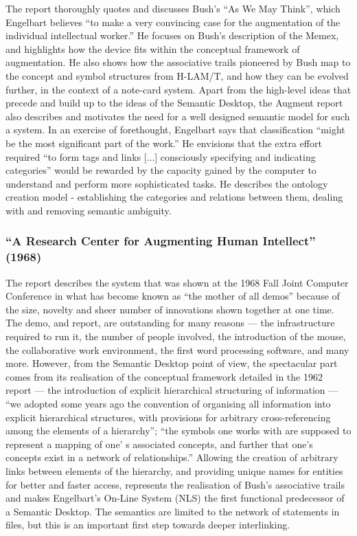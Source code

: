 The report thoroughly quotes and discusses Bush's ``As We May Think'', which Engelbart believes ``to make a very convincing case for the augmentation of the individual intellectual worker.'' He focuses on Bush's description of the Memex, and highlights how the device fits within the conceptual framework of augmentation. He also shows how the associative trails pioneered by Bush map to the concept and symbol structures from H-LAM/T, and how they can be evolved further, in the context of a note-card system.
Apart from the high-level ideas that precede and build up to the ideas of the Semantic Desktop, the Augment report also describes and motivates the need for a well designed semantic model for such a system. In an exercise of forethought, Engelbart says that classification ``might be the most significant part of the work.'' He envisions that the extra effort required ``to form tags and links [...] consciously specifying and indicating categories'' would be rewarded by the capacity gained by the computer to understand and perform more sophisticated tasks. He describes the ontology creation model - establishing the categories and relations between them, dealing with and removing semantic ambiguity.

\subsubsection{``A Research Center for Augmenting Human Intellect'' (1968)}

The \cite{Engelbart1968} report describes the system that was shown at the 1968 Fall Joint Computer Conference in what has become known as ``the mother of all demos'' because of the size, novelty and sheer number of innovations shown together at one time. The demo, and report, are outstanding for many reasons --- the infrastructure required to run it, the number of people involved, the introduction of the mouse, the collaborative work environment, the first word processing software, and many more. However, from the Semantic Desktop point of view, the spectacular part comes from its realisation of the conceptual framework detailed in the 1962 report \cite{Engelbart1962} --- the introduction of explicit hierarchical structuring of information --- ``we adopted some years ago the convention of organising all information into explicit hierarchical structures, with provisions for arbitrary cross-referencing among the elements of a hierarchy''; ``the symbols one works with are supposed to represent a mapping of one'
s associated concepts, and further that one's concepts exist in a network of relationships.''
Allowing the creation of arbitrary links between elements of the hierarchy, and providing unique names for entities for better and faster access, represents the realisation of Bush's associative trails and makes Engelbart's On-Line System (NLS) the first functional predecessor of a Semantic Desktop. The semantics are limited to the network of statements in files, but this is an important first step towards deeper interlinking.

